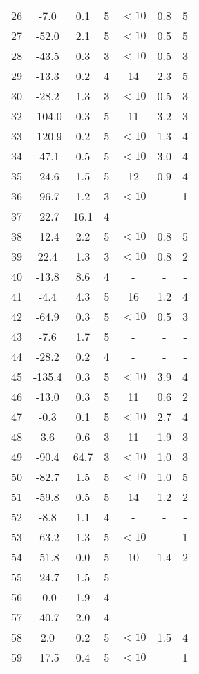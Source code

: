 \begin{longtable}{ccccccc}
\rowcolor[gray]{0.9} 26 & -7.0 & 0.1 & 5 & $<10$ & 0.8 & 5\\
\rowcolor[gray]{0.9} 27 & -52.0 & 2.1 & 5 & $<10$ & 0.5 & 5\\
\rowcolor[gray]{0.9} 28 & -43.5 & 0.3 & 3 & $<10$ & 0.5 & 3\\
29 & -13.3 & 0.2 & 4 & 14 & 2.3 & 5\\
30 & -28.2 & 1.3 & 3 & $<10$ & 0.5 & 3\\
32 & -104.0 & 0.3 & 5 & 11 & 3.2 & 3\\
33 & -120.9 & 0.2 & 5 & $<10$ & 1.3 & 4\\
34 & -47.1 & 0.5 & 5 & $<10$ & 3.0 & 4\\
35 & -24.6 & 1.5 & 5 & 12 & 0.9 & 4\\
36 & -96.7 & 1.2 & 3 & $<10$ & - & 1\\
37 & -22.7 & 16.1 & 4 & - & - & -\\
38 & -12.4 & 2.2 & 5 & $<10$ & 0.8 & 5\\
39 & 22.4 & 1.3 & 3 & $<10$ & 0.8 & 2\\
40 & -13.8 & 8.6 & 4 & - & - & -\\
41 & -4.4 & 4.3 & 5 & 16 & 1.2 & 4\\
42 & -64.9 & 0.3 & 5 & $<10$ & 0.5 & 3\\
43 & -7.6 & 1.7 & 5 & - & - & -\\
44 & -28.2 & 0.2 & 4 & - & - & -\\
45 & -135.4 & 0.3 & 5 & $<10$ & 3.9 & 4\\
46 & -13.0 & 0.3 & 5 & 11 & 0.6 & 2\\
47 & -0.3 & 0.1 & 5 & $<10$ & 2.7 & 4\\
48 & 3.6 & 0.6 & 3 & 11 & 1.9 & 3\\
49 & -90.4 & 64.7 & 3 & $<10$ & 1.0 & 3\\
50 & -82.7 & 1.5 & 5 & $<10$ & 1.0 & 5\\
51 & -59.8 & 0.5 & 5 & 14 & 1.2 & 2\\
52 & -8.8 & 1.1 & 4 & - & - & -\\
53 & -63.2 & 1.3 & 5 & $<10$ & - & 1\\
54 & -51.8 & 0.0 & 5 & 10 & 1.4 & 2\\
55 & -24.7 & 1.5 & 5 & - & - & -\\
56 & -0.0 & 1.9 & 4 & - & - & -\\
57 & -40.7 & 2.0 & 4 & - & - & -\\
58 & 2.0 & 0.2 & 5 & $<10$ & 1.5 & 4\\
59 & -17.5 & 0.4 & 5 & $<10$ & - & 1\\

\end{longtable}
